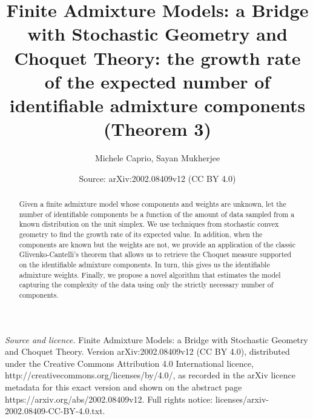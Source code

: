 \documentclass[10pt,a4paper]{amsart}
\title[The growth rate of the expected number of identifiable components]{Finite Admixture Models: a Bridge with Stochastic Geometry and Choquet Theory: the growth rate of the expected number of identifiable admixture components (Theorem 3)}
\author{Michele Caprio, Sayan Mukherjee}
\date{Source: arXiv:2002.08409v12 (CC BY 4.0)}
\theoremstyle{plain}
\begin{document}
\begin{abstract}
Given a finite admixture model whose components and weights are unknown, let the number of identifiable components be a function of the amount of data sampled from a known distribution on the unit simplex. We use techniques from stochastic convex geometry to find the growth rate of its expected value. In addition, when the components are known but the weights are not, we provide an application of the classic Glivenko-Cantelli's theorem that allows us to retrieve the Choquet measure supported on the identifiable admixture components. In turn, this gives us the identifiable admixture weights. Finally, we propose a novel algorithm that estimates the model capturing the complexity of the data using only the strictly necessary number of components.


\end{abstract}
\maketitle

\noindent\emph{Source and licence.} Finite Admixture Models: a Bridge with Stochastic Geometry and Choquet Theory. Version arXiv:2002.08409v12 (CC BY 4.0), distributed under the Creative Commons Attribution 4.0 International licence, http://creativecommons.org/licenses/by/4.0/, as recorded in the arXiv licence metadata for this exact version and shown on the abstract page https://arxiv.org/abs/2002.08409v12. Full rights notice: licenses/arxiv-2002.08409-CC-BY-4.0.txt.\par\smallskip
\end{document}
